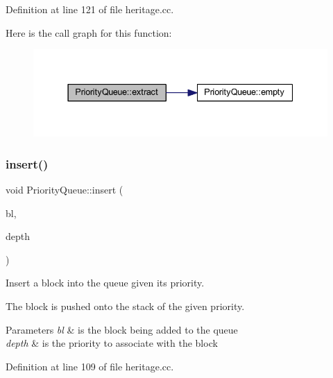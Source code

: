 Definition at line 121 of file heritage.\+cc.

Here is the call graph for this function\+:
\nopagebreak
\begin{figure}[H]
\begin{center}
\leavevmode
\includegraphics[width=337pt]{class_priority_queue_a6cd7194cc2cb973f33158a1d7dc7acc9_cgraph}
\end{center}
\end{figure}
\mbox{\label{class_priority_queue_a8abe49ecb70033726324497f4aafdb74}} 
\subsubsection{\texorpdfstring{insert()}{insert()}}
{\footnotesize\ttfamily void Priority\+Queue\+::insert (\begin{DoxyParamCaption}\item[{\mbox{\hyperlink{class_flow_block}{Flow\+Block}} $\ast$}]{bl,  }\item[{int4}]{depth }\end{DoxyParamCaption})}



Insert a block into the queue given its priority. 

The block is pushed onto the stack of the given priority. 
\begin{DoxyParams}{Parameters}
{\em bl} & is the block being added to the queue \\
\hline
{\em depth} & is the priority to associate with the block \\
\hline
\end{DoxyParams}


Definition at line 109 of file heritage.\+cc.

\mbox{\label{class_priority_queue_a75ec253ec066ea6dc172f1f8bd88758b}} 
